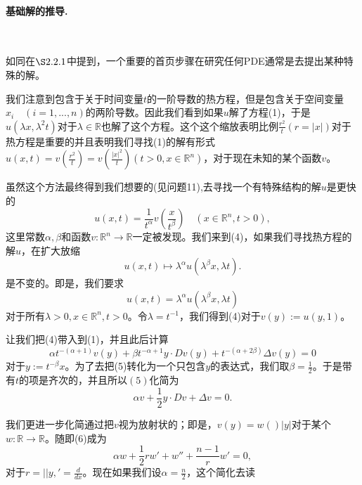 \documentclass[leqno]{article}
\numberwithin{equation}{subsection}%
\begin{document}
\paragraph{基础解的推导.}~{}
\par
如同在$\S 2.2.1$中提到，一个重要的首页步骤在研究任何PDE通常是去提出某种特殊的解。
\par
我们注意到包含于关于时间变量$t$的一阶导数的热方程，但是包含关于空间变量$x_{i}\quad(i=1,...,n)$的两阶导数。因此我们看到如果$u$解了方程(1)，于是$u(\lambda x,\lambda^{2}t)$对于$\lambda\in\mathbb{R}$也解了这个方程。这个这个缩放表明比例$\frac{r^{2}}{t}(r=|x|)$对于热方程是重要的并且表明我们寻找(1)的解有形式$u(x,t)=v(\frac{r^{2}}{t})=v(\frac{|x|^{2}}{t})(t>0,x\in\mathbb{R}^{n})$，对于现在未知的某个函数$v$。
\par
虽然这个方法最终得到我们想要的(见问题11),去寻找一个有特殊结构的解$u$是更快的
\begin{equation}
u(x,t)=\frac{1}{t^{\alpha}}v\left(\frac{x}{t^{\beta}}\right)\quad(x\in\mathbb{R}^{n},t>0),
\end{equation}
这里常数$\alpha,\beta$和函数$v:\mathbb{R}^{n}\rightarrow\mathbb{R}$一定被发现。我们来到(4)，如果我们寻找热方程的解$u$，在扩大放缩
\begin{equation*}
u(x,t)\mapsto\lambda^{\alpha}u(\lambda^{\beta}x,\lambda t).
\end{equation*}
是不变的。即是，我们要求
\begin{equation*}
u(x,t)=\lambda^{\alpha}u(\lambda^{\beta}x,\lambda t)
\end{equation*}
对于所有$\lambda>0,x\in\mathbb{R}^{n},t>0$。令$\lambda=t^{-1}$，我们得到(4)对于$v(y):=u(y,1)$。
\par
让我们把(4)带入到(1)，并且此后计算
\begin{equation}
\alpha t^{-(\alpha+1)}v(y)+\beta t^{-\alpha+1}y\cdot Dv(y)+t^{-(\alpha+2\beta)}\Delta v(y)=0
\end{equation}
对于$y:=t^{-\beta}x$。为了去把(5)转化为一个只包含$y$的表达式，我们取$\beta=\frac{1}{2}$。于是带有$t$的项是齐次的，并且所以$(5)$化简为
\begin{equation}
\alpha v+\frac{1}{2}y\cdot Dv+\Delta v=0.
\end{equation}
\par
我们更进一步化简通过把$v$视为放射状的；即是，$v(y)=w()|y|$对于某个$w:\mathbb{R}\rightarrow\mathbb{R}$。随即(6)成为
\begin{equation*}
\alpha w+\frac{1}{2}rw'+w''+\frac{n-1}{r}w'=0,
\end{equation*}
对于$r=||y,'=\frac{d}{dx}$。现在如果我们设$\alpha=\frac{n}{2}$，这个简化去读
\end{document}
